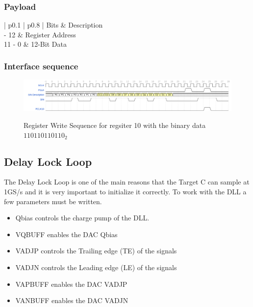 \subsubsection*{Payload}
\begin{table}[H]
\centering
\begin{tabu}{  | p{0.1\linewidth} | p{0.8\linewidth} |}
\hline
\HEADTABLE
Bits & Description\\
 - 12	& Register Address \\
11 - 0	& 12-Bit Data  	\\
\hline
\end{tabu}
\caption{\label{tab:reg76} TARGETC 19-Bit Register payload}
\end{table}

\subsubsection*{Interface sequence}
\begin{figure}[H]
\centering
\includegraphics[width=1\textwidth]{figures/wavedrom/registers2.png}\\
\caption{\label{fig:TC_writeregister} Register Write Sequence for regsiter 10 with the binary data $110110110110_{2}$}
\end{figure}

\newpage
\subsection{Delay Lock Loop}
The Delay Lock Loop is one of the main reasons that the Target C can sample at 1GS/s and it is very important to initialize it correctly. To work with the DLL a few parameters must be written.
\begin{itemize}
  \item Qbias controls the charge pump of the DLL.
  \item VQBUFF enables the DAC Qbias
  \item VADJP controls the Trailing edge (TE) of the signals
  \item VADJN controls the Leading edge (LE) of the signals
  \item VAPBUFF enables the DAC VADJP
  \item VANBUFF enables the DAC VADJN
\end{itemize}

